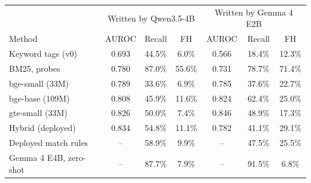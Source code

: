 \begin{tabular*}{\textwidth}{@{\extracolsep{\fill}}lcccccc@{}}
\toprule
& \multicolumn{3}{c}{Written by Qwen3.5-4B} & \multicolumn{3}{c}{Written by Gemma 4 E2B}\\ Method & AUROC & Recall & FH & AUROC & Recall & FH\\
\midrule
Keyword tags (v0) & 0.693 & 44.5\% & 6.0\% & 0.566 & 18.4\% & 12.3\%\\
BM25, probes & 0.780 & 87.0\% & 55.6\% & 0.731 & 78.7\% & 71.4\%\\
bge-small (33M) & 0.789 & 33.6\% & 6.9\% & 0.785 & 37.6\% & 22.7\%\\
bge-base (109M) & 0.808 & 45.9\% & 11.6\% & 0.824 & 62.4\% & 25.0\%\\
gte-small (33M) & 0.826 & 50.0\% & 7.4\% & 0.846 & 48.9\% & 17.3\%\\
Hybrid (deployed) & 0.834 & 54.8\% & 11.1\% & 0.782 & 41.1\% & 29.1\%\\
\midrule
Deployed match rules & -- & 58.9\% & 9.9\% & -- & 47.5\% & 25.5\%\\
Gemma 4 E4B, zero-shot & -- & 87.7\% & 7.9\% & -- & 91.5\% & 6.8\%\\
\bottomrule
\end{tabular*}
